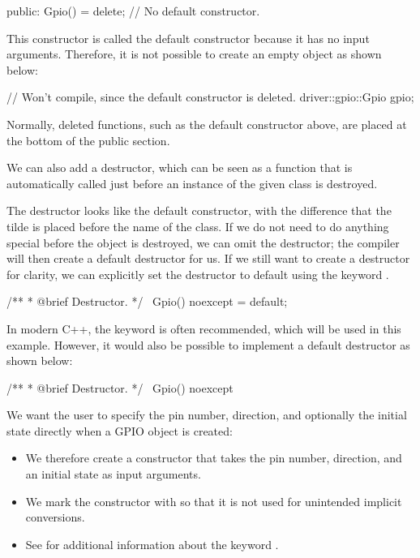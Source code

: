 \begin{cppcode}
public:
    Gpio() = delete; // No default constructor.
\end{cppcode}

\noindent This constructor is called the default constructor because it has no input arguments.
Therefore, it is not possible to create an empty object as shown below:

\begin{cppcode}
// Won't compile, since the default constructor is deleted.
driver::gpio::Gpio gpio{};
\end{cppcode}

\noindent Normally, deleted functions, such as the default constructor above, are placed at the
bottom of the public section.

We can also add a destructor, which can be seen as a function that is automatically called just
before an instance of the given class is destroyed.

The destructor looks like the default constructor, with the difference that the tilde \code{~} is
placed before the name of the class. If we do not need to do anything special before the object is
destroyed, we can omit the destructor; the compiler will then create a default destructor for us.
If we still want to create a destructor for clarity, we can explicitly set the destructor to default
using the keyword .

\begin{cppcode}
/**
 * @brief Destructor.
 */
~Gpio() noexcept = default;
\end{cppcode}

\noindent In modern C++, the keyword  is often recommended, which will be used in this
example. However, it would also be possible to implement a default destructor as shown below:

\begin{cppcode}
/**
 * @brief Destructor.
 */
~Gpio() noexcept {}
\end{cppcode}

\noindent We want the user to specify the pin number, direction, and optionally the initial state
directly when a GPIO object is created:
\begin{itemize}
  \item We therefore create a constructor that takes the pin number, direction, and an initial
    state as input arguments.
  \item We mark the constructor with  so that it is not used for unintended implicit
    conversions.
  \item See  for additional information about the keyword .
\end{itemize}

